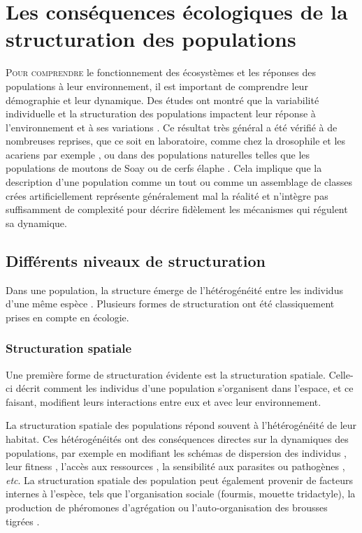 \section{Les conséquences écologiques de la
structuration des populations}

\lettrine[lines=3]{P}{our comprendre} le fonctionnement des écosystèmes et les
réponses des populations à leur environnement, il est important de comprendre
leur démographie et leur dynamique. Des études ont montré que la variabilité
individuelle et la structuration des populations impactent leur réponse à
l'environnement et à ses variations \autocites{benton2005a}.
Ce résultat très général a été vérifié à de nombreuses reprises, que ce soit en
laboratoire, comme chez la drosophile \autocites{madalena1974a} et les acariens
par exemple \autocites{benton2005a}, ou dans des populations naturelles telles
que les populations de moutons de Soay \autocites{coulson2001a,ozgul2009a} ou de
cerfs élaphe \autocites{langvatn1999a}.
Cela implique que la description d'une population comme un tout ou comme un
assemblage de classes crées artificiellement représente généralement mal la
réalité et n'intègre pas suffisamment de complexité pour décrire fidèlement les
mécanismes qui régulent sa dynamique.

\subsection{Différents niveaux de structuration}

Dans une population, la structure émerge de l'hétérogénéité entre les
individus d'une même espèce \autocites{benton2006a}. Plusieurs formes de
structuration ont été classiquement prises en compte en écologie.

\subsubsection{Structuration spatiale}

Une première forme de structuration évidente est la structuration spatiale.
Celle-ci décrit comment les individus d'une population s'organisent dans
l'espace, et ce faisant, modifient leurs interactions entre eux et avec leur environnement. 

La structuration spatiale des populations répond souvent à l'hétérogénéité de
leur habitat. Ces hétérogénéités ont des conséquences directes sur la dynamiques
des populations, par exemple en modifiant les schémas de dispersion des
individus \autocites{hiebeler2000a}, leur fitness \autocites{zajkac2008a},
l'accès aux ressources \autocites{burger2008a}, la sensibilité aux parasites ou
pathogènes \autocites{su2009a}, \textit{etc}. La structuration spatiale des
population peut également provenir de facteurs internes à l'espèce, tels que
l'organisation sociale (fourmis, mouette tridactyle), la production de
phéromones d'agrégation
\autocites[Collemboles][]{joosse1974aggregational,manica2001aggregation} ou
l'auto-organisation des brousses tigrées \autocites{deblauwe2008global}.

